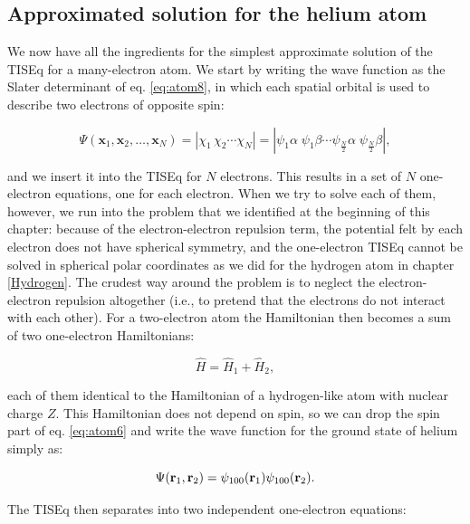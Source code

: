 \documentclass[
  english,
  9pt,
]{extbook}
\theoremstyle{definition}
\theoremstyle{definition}
\theoremstyle{definition}
\theoremstyle{definition}
\theoremstyle{remark}
\begin{document}
\subsection{Approximated solution for the helium atom}\label{approximated-solution-for-the-helium-atom}

We now have all the ingredients for the simplest approximate solution of the TISEq for a many-electron atom. We start by writing the wave function as the Slater determinant of eq. \eqref{eq:atom8}, in which each spatial orbital is used to describe two electrons of opposite spin:

\begin{equation}
\Psi (\mathbf{x}_{1},\mathbf{x}_{2},\ldots ,\mathbf{x}_{N})= |\chi_{1}\,\chi_{2}\cdots \chi_{N}| = |\psi_{1}\alpha\;\psi_{1}\beta\cdots \psi_{\frac{N}{2}}\alpha\;\psi_{\frac{N}{2}}\beta|,
\label{eq:hf1}
\end{equation}

and we insert it into the TISEq for \(N\) electrons. This results in a set of \(N\) one-electron equations, one for each electron. When we try to solve each of them, however, we run into the problem that we identified at the beginning of this chapter: because of the electron-electron repulsion term, the potential felt by each electron does not have spherical symmetry, and the one-electron TISEq cannot be solved in spherical polar coordinates as we did for the hydrogen atom in chapter \ref{Hydrogen}. The crudest way around the problem is to neglect the electron-electron repulsion altogether (i.e., to pretend that the electrons do not interact with each other). For a two-electron atom the Hamiltonian then becomes a sum of two one-electron Hamiltonians:

\begin{equation}
\hat{H} =\hat{H}_1+\hat{H}_2,
\label{eq:hf2}
\end{equation}

each of them identical to the Hamiltonian of a hydrogen-like atom with nuclear charge \(Z\). This Hamiltonian does not depend on spin, so we can drop the spin part of eq. \eqref{eq:atom6} and write the wave function for the ground state of helium simply as:

\begin{equation}
\Psi({\bf r}_1, {\bf r}_2) = \psi_{100}({\bf r}_1)\psi_{100}({\bf r}_2).
\label{eq:hf3}
\end{equation}

The TISEq then separates into two independent one-electron equations:
\end{document}
